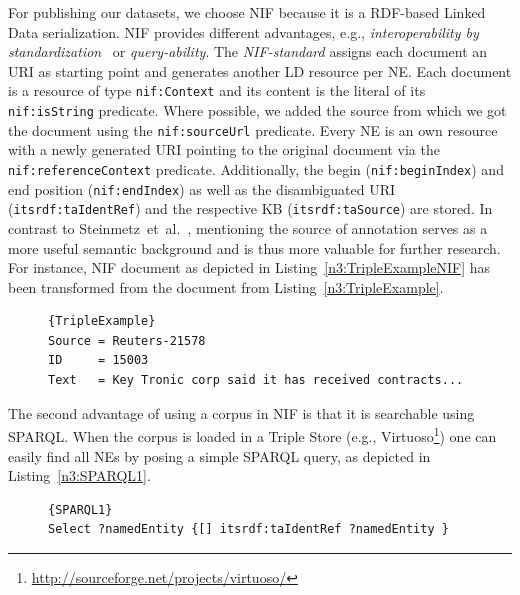 For publishing our datasets, we choose NIF because it is a \ac{RDF}-based Linked Data serialization.
NIF provides different advantages, e.g., \emph{interoperability by standardization}~\cite{ISWC2013NIF} or \emph{query-ability}.
The \emph{NIF-standard} assigns each document an URI as starting point and generates another \ac{LD}  resource per NE.
Each document is a resource of type \texttt{nif:Context} and its content is the literal of its \texttt{nif:isString} predicate. 
Where possible, we added the source from which we got the document using the \texttt{nif:sourceUrl} predicate.
Every NE is an own resource with a newly generated URI pointing to the original document via the \texttt{nif:referenceContext} predicate.
Additionally, the begin (\texttt{nif:beginIndex}) and end position (\texttt{nif:endIndex}) as well as the disambiguated URI (\texttt{itsrdf:taIdentRef}) and the respective \ac{KB}  (\texttt{itsrdf:taSource}) are stored.
In contrast to Steinmetz~et~al.~\cite{steinmetz-n-2013-statistical}, mentioning the source of annotation serves as a more useful semantic background and is thus more valuable for further research.
For instance, NIF document as depicted in Listing~\ref{n3:TripleExampleNIF} has been transformed from the document from Listing~\ref{n3:TripleExample}.

\begin{figure}[htb!]
\begin{lstlisting}[label=n3:TripleExample,caption=Example input text.]{TripleExample}
Source = Reuters-21578
ID     = 15003
Text   = Key Tronic corp said it has received contracts...
\end{lstlisting}
\end{figure}




The second advantage of using a corpus in NIF is that it is searchable using SPARQL.
When the corpus is loaded in a Triple Store (e.g., Virtuoso\footnote{\url{http://sourceforge.net/projects/virtuoso/}}) one can easily find all NEs by posing a simple SPARQL query, as depicted in Listing~\ref{n3:SPARQL1}.
\begin{figure}[htb!]
\begin{lstlisting}[label=n3:SPARQL1,caption=SPARQL query to get all NEs.]{SPARQL1}
Select ?namedEntity {[] itsrdf:taIdentRef ?namedEntity }
\end{lstlisting}
\end{figure}
